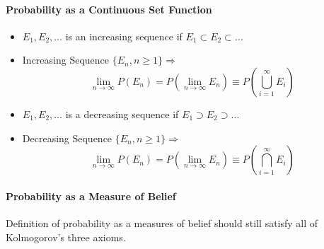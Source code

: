 \paragraph{Probability as a Continuous Set Function}
\begin{itemize}
  \item \(E_1,E_2,\ldots\) is an increasing sequence if \(E_1\subset E_2\subset\ldots\)
  \item Increasing Sequence
    \(\{E_n,n\ge1\}\Rightarrow\)
    \[\lim\limits_{n\to\infty}P(E_n)=P(\lim\limits_{n\to \infty}E_n)\equiv
    P(\bigcup\limits^\infty_{i=1}E_i)\]
  \item \(E_1,E_2,\ldots\) is a decreasing sequence if \(E_1\supset E_2\supset\ldots\)
  \item Decreasing Sequence
    \(\{E_n,n\ge1\}\Rightarrow\)
    \[\lim\limits_{n\to\infty}P(E_n)=P(\lim\limits_{n\to \infty}E_n)\equiv
    P(\bigcap\limits^\infty_{i=1}E_i)\]
\end{itemize}
\paragraph{Probability as a Measure of Belief}
Definition of probability as a measures of belief should still satisfy all of
Kolmogorov's three axioms.
